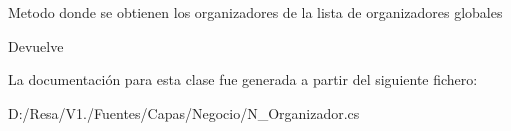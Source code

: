 Metodo donde se obtienen los organizadores de la lista de organizadores globales 

\begin{DoxyReturn}{Devuelve}

\end{DoxyReturn}


La documentación para esta clase fue generada a partir del siguiente fichero\+:\begin{DoxyCompactItemize}
\item 
D\+:/\+Resa/\+V1./\+Fuentes/\+Capas/\+Negocio/N\+\_\+\+Organizador.\+cs\end{DoxyCompactItemize}
